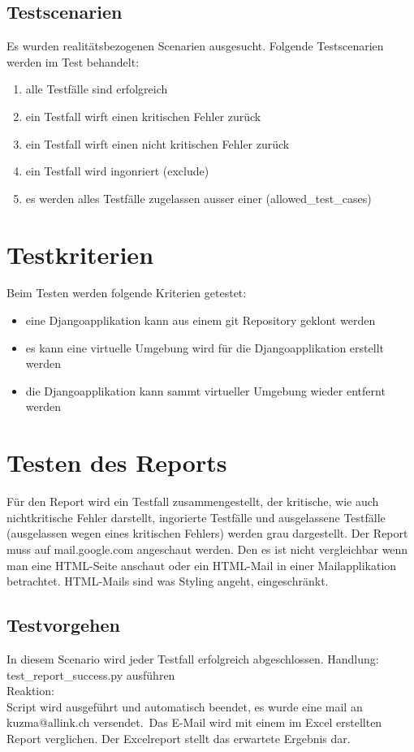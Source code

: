 \subsection{Testscenarien}
Es wurden realitätsbezogenen Scenarien ausgesucht. 
Folgende Testscenarien werden im Test behandelt:
\begin{enumerate}
    \item alle Testfälle sind erfolgreich 
    \item ein Testfall wirft einen kritischen Fehler zurück
    \item ein Testfall wirft einen nicht kritischen Fehler zurück
    \item ein Testfall wird ingonriert (exclude)
    \item es werden alles Testfälle zugelassen ausser einer (allowed\_test\_cases) 
\end{enumerate}

\section{Testkriterien}
Beim Testen werden folgende Kriterien getestet:
\begin{itemize}
    \item eine Djangoapplikation kann aus einem git Repository geklont werden
    \item es kann eine virtuelle Umgebung wird für die Djangoapplikation erstellt werden
    \item die Djangoapplikation kann sammt virtueller Umgebung wieder entfernt werden
\end{itemize}

\section{Testen des Reports}
Für den Report wird ein Testfall zusammengestellt, der kritische, wie auch nichtkritische Fehler darstellt, ingorierte Testfälle und ausgelassene Testfälle (ausgelassen wegen eines kritischen Fehlers) werden grau dargestellt. 
 Der Report muss auf mail.google.com angeschaut werden. Den es ist nicht vergleichbar wenn man eine HTML-Seite anschaut oder ein HTML-Mail in einer Mailapplikation betrachtet. HTML-Mails sind was Styling angeht, eingeschränkt. 

\clearpage
\subsection{Testvorgehen }
In diesem Scenario wird jeder Testfall erfolgreich abgeschlossen.
Handlung: \\
test\_report\_success.py ausführen \\
Reaktion: \\
Script wird ausgeführt und automatisch beendet, es wurde eine mail an kuzma@allink.ch versendet.\
Das E-Mail wird mit einem im Excel erstellten Report verglichen. Der Excelreport stellt das erwartete Ergebnis dar. 


